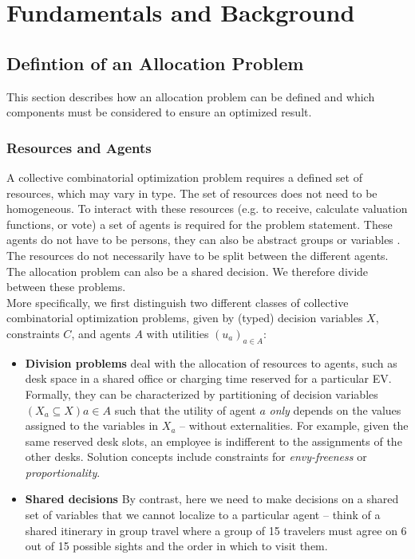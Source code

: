 \documentclass[german, a4paper, 11pt, oneside]{scrbook}
\begin{document}
\chapter{Fundamentals and Background}
\section{Defintion of an Allocation Problem}
This section describes how an allocation problem can be defined and which components must be considered to ensure an optimized result.
\subsection{Resources and Agents}
A collective combinatorial optimization problem requires a defined set of resources, which may vary in type.  The set of resources does not need to be homogeneous. To interact with these resources (e.g. to receive, calculate valuation functions, or vote) a set of agents is required for the problem statement. These agents do not have to be persons, they can also be abstract groups or variables \cite{.2022, FelixBrandtVincentConitzerUlleEndrissJeromeLangandArielD.Procaccia.}. The resources do not necessarily have to be split between the different agents. The allocation problem can also be a shared decision. We therefore divide between these problems. \\More specifically, we first distinguish two different classes of collective combinatorial optimization problems, given by (typed) decision variables $X$, constraints $C$, and agents $A$ with utilities $(u_a)_{a \in A}$:

\begin{itemize}
    \item \textbf{Division problems} deal with the allocation of resources to agents, such as desk space in a shared office or charging time reserved for a particular EV. Formally, they can be characterized by partitioning of decision variables $(X_a \subseteq X) {a \in A}$ such that the utility of agent $a$ \emph{only} depends on the values assigned to the variables in $X_a$ -- without externalities. For example, given the same reserved desk slots, an employee is indifferent to the assignments of the other desks. Solution concepts include constraints for \emph{envy-freeness} or \emph{proportionality}.
    \item \textbf{Shared decisions} By contrast, here we need to make decisions on a shared set of variables that we cannot localize to a particular agent -- think of a shared itinerary in group travel where a group of 15 travelers must agree on 6 out of 15 possible sights and the order in which to visit them. 
\end{itemize}
\end{document}

